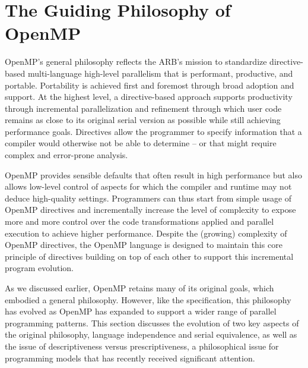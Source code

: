 \section{The Guiding Philosophy of OpenMP}
\label{sec:philosophy}

OpenMP's general philosophy reflects the ARB's mission to standardize 
directive-based multi-language high-level parallelism that is performant, 
productive, and portable. Portability is achieved first and foremost through
broad adoption and support. At the highest level, a directive-based approach 
supports productivity through incremental parallelization and refinement 
through which user code remains as close to its original serial version as 
possible while still achieving performance goals. Directives allow the 
programmer to specify information that a compiler would otherwise not be 
able to determine -- or that might require complex and error-prone analysis. 

OpenMP provides sensible defaults that often result in high performance but 
also allows low-level control of aspects for which the compiler and runtime 
may not deduce high-quality settings. Programmers can thus start from simple
usage of OpenMP directives and incrementally increase the level of complexity 
to expose more and more control over the code transformations applied and 
parallel execution to achieve higher performance. Despite the (growing) 
complexity of OpenMP directives, the OpenMP language is designed to maintain 
this core principle of directives building on top of each other to support 
this incremental program evolution.

As we discussed earlier, OpenMP retains many of its original goals, which 
embodied a general philosophy. However, like the specification, this philosophy
has evolved as OpenMP has expanded to support a wider range of parallel 
programming patterns. This section discusses the evolution of two key aspects 
of the original philosophy, language independence and serial equivalence, as 
well as the issue of descriptiveness versus prescriptiveness, a philosophical 
issue for programming models that has recently received significant attention.




